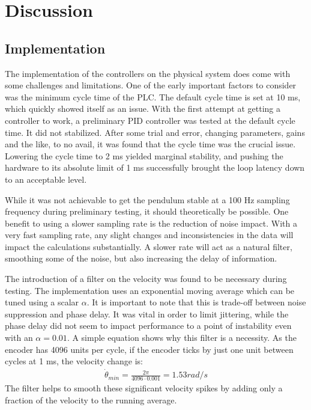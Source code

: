 \chapter{Discussion}
\label{chap:discussion}

\section{Implementation}

The implementation of the controllers on the physical system does come with some challenges and limitations. One of the early important factors to consider was the minimum cycle time of the PLC. The default cycle time is set at 10 ms, which quickly showed itself as an issue. With the first attempt at getting a controller to work, a preliminary PID controller was tested at the default cycle time. It did not stabilized. After some trial and error, changing parameters, gains and the like, to no avail, it was found that the cycle time was the crucial issue. Lowering the cycle time to 2 ms yielded marginal stability, and pushing the hardware to its absolute limit of 1 ms successfully brought the loop latency down to an acceptable level.

While it was not achievable to get the pendulum stable at a 100 Hz sampling frequency during preliminary testing, it should theoretically be possible. One benefit to using a slower sampling rate is the reduction of noise impact. With a very fast sampling rate, any slight changes and inconsistencies in the data will impact the calculations substantially. A slower rate will act as a natural filter, smoothing some of the noise, but also increasing the delay of information.

The introduction of a filter on the velocity was found to be necessary during testing. The implementation uses an exponential moving average which can be tuned using a scalar $\alpha$. It is important to note that this is trade-off between noise suppression and phase delay. It was vital in order to limit jittering, while the phase delay did not seem to impact performance to a point of instability even with an $\alpha = 0.01$. A simple equation shows why this filter is a necessity. As the encoder has 4096 units per cycle, if the encoder ticks by just one unit between cycles at 1 ms, the velocity change is:
\begin{align}
	\dot{\theta}_{min} = \frac{2\pi}{4096 \cdot 0.001} = 1.53 rad/s
\end{align}
The filter helps to smooth these significant velocity spikes by adding only a fraction of the velocity to the running average.

